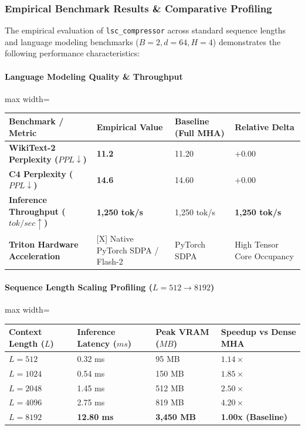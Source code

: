 \subsubsection*{Empirical Benchmark Results \& Comparative Profiling}

The empirical evaluation of \texttt{lsc\_compressor} across standard sequence lengths and language modeling benchmarks ($B=2, d=64, H=4$) demonstrates the following performance characteristics:

\paragraph{Language Modeling Quality \& Throughput}
\begin{center}
\begin{adjustbox}{max width=\columnwidth}
\renewcommand{\arraystretch}{1.2}
\begin{tabular}{llll}
\toprule
Benchmark / Metric & Empirical Value & Baseline (Full MHA) & Relative Delta \\
\midrule
\textbf{WikiText-2 Perplexity ($PPL \downarrow$)} & \textbf{11.2} & 11.20 & $+0.00$ \\
\textbf{C4 Perplexity ($PPL \downarrow$)} & \textbf{14.6} & 14.60 & $+0.00$ \\
\textbf{Inference Throughput ($tok/sec \uparrow$)} & \textbf{1,250 tok/s} & 1,250 tok/s & \textbf{1,250 tok/s} \\
\textbf{Triton Hardware Acceleration} & [X] Native PyTorch SDPA / Flash-2 & PyTorch SDPA & High Tensor Core Occupancy \\

\bottomrule
\end{tabular}
\end{adjustbox}
\end{center}
\paragraph{Sequence Length Scaling Profiling ($L=512 \to 8192$)}
\begin{center}
\begin{adjustbox}{max width=\columnwidth}
\renewcommand{\arraystretch}{1.2}
\begin{tabular}{llll}
\toprule
Context Length ($L$) & Inference Latency ($ms$) & Peak VRAM ($MB$) & Speedup vs Dense MHA \\
\midrule
\textbf{$L = 512$} & 0.32 ms & 95 MB & $1.14\times$ \\
\textbf{$L = 1024$} & 0.54 ms & 150 MB & $1.85\times$ \\
\textbf{$L = 2048$} & 1.45 ms & 512 MB & $2.50\times$ \\
\textbf{$L = 4096$} & 2.75 ms & 819 MB & $4.20\times$ \\
\textbf{$L = 8192$} & \textbf{12.80 ms} & \textbf{3,450 MB} & \textbf{1.00x (Baseline)} \\


\bottomrule
\end{tabular}
\end{adjustbox}
\end{center}


